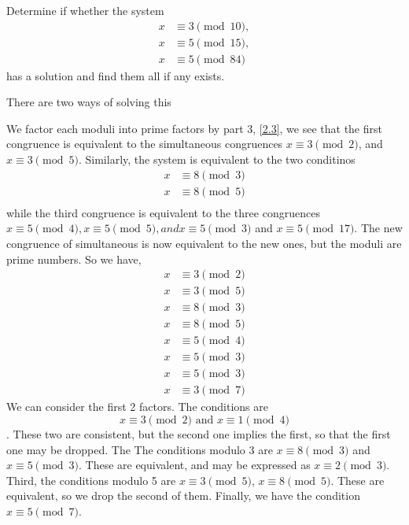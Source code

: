 \documentclass[11pt]{article}
\begin{document}
\begin{example}
    Determine if whether the system
    \[
        \begin{aligned}
            x & \equiv 3 \pmod{10}, \\
            x & \equiv 5 \pmod{15}, \\
            x & \equiv 5 \pmod{84}
        \end{aligned}
    \]
    has a solution and find them all if any exists.
\end{example}
There are two ways of solving this
\begin{solution}
    We factor each moduli into prime factors by part 3, \cref{2.3}, we see that the first congruence is equivalent to the simultaneous congruences \(x \equiv 3 \pmod{2}\), and \(x \equiv 3 \pmod{5}\). Similarly, the system is equivalent to the two conditinos
    \[\begin{aligned}
            x & \equiv 8 \pmod{3} \\
            x & \equiv 8 \pmod{5} \\
        \end{aligned}\]
    while the third congruence is equivalent to the three congruences \(x \equiv 5
    \pmod{4}, x \equiv 5 \pmod{5}, and x \equiv 5 \pmod{3}\) and \(x \equiv 5
    \pmod{17}\). The new congruence of simultaneous is now equivalent to the new
    ones, but the moduli are prime numbers. So we have,\[\begin{aligned}
            x & \equiv 3 \pmod{2} \\
            x & \equiv 3 \pmod{5} \\
            x & \equiv 8 \pmod{3} \\
            x & \equiv 8 \pmod{5} \\
            x & \equiv 5 \pmod{4} \\
            x & \equiv 5 \pmod{3} \\
            x & \equiv 5 \pmod{3} \\
            x & \equiv 3 \pmod{7}
        \end{aligned}\]
    We can consider the first 2 factors. The conditions are \[x \equiv 3 \pmod{2} \text{ and } x \equiv 1 \pmod{4}\]. These two are consistent, but the second one implies the first, so that the first one may be dropped. The
    The conditions modulo 3 are \(x \equiv 8 \pmod{3}\) and \(x \equiv 5 \pmod{3}\). These are equivalent, and may be expressed as \(x \equiv 2 \pmod{3}\). Third, the conditions modulo 5 are \(x \equiv 3 \pmod{5}\), \(x \equiv 8 \pmod{5}\). These are equivalent, so we drop the second of them. Finally, we have the condition \(x \equiv 5 \pmod{7}\).

\end{solution}
\end{document}
